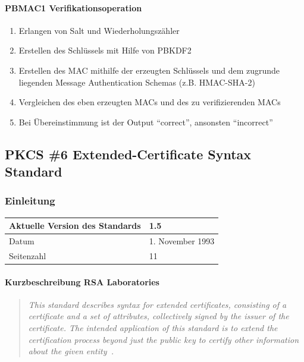 \documentclass[10pt,a4paper]{article}
\begin{document}
\paragraph{PBMAC1 Verifikationsoperation}
\begin{enumerate}
    \item Erlangen von Salt und Wiederholungszähler
    \item Erstellen des Schlüssels mit Hilfe von PBKDF2
    \item Erstellen des MAC mithilfe der erzeugten Schlüssels und dem zugrunde liegenden
        Message Authentication Schemas (z.B. HMAC-SHA-2)
    \item Vergleichen des eben erzeugten MACs und des zu verifizierenden MACs
    \item Bei Übereinstimmung ist der Output "`correct"', ansonsten "`incorrect"'
\end{enumerate}

\subsection{PKCS \#6 Extended-Certificate Syntax Standard}

\subsubsection{Einleitung}
\begin{table}[ht]
    \centering
    \begin{tabular}{|l|l|} \hline
        Aktuelle Version des Standards & 1.5 \\\hline
        Datum & 1. November 1993 \\\hline
        Seitenzahl & 11 \\\hline
    \end{tabular}
\end{table}

\paragraph{Kurzbeschreibung RSA Laboratories}
\begin{quotation}
    \itshape This standard describes syntax for extended certificates, consisting of a
    certificate and a set of attributes, collectively signed by the issuer of the
    certificate. The intended application of this standard is to extend the certification
    process beyond just the public key to certify other information about the given
    entity~\cite{pkcs6}.
\end{quotation}
\end{document}
